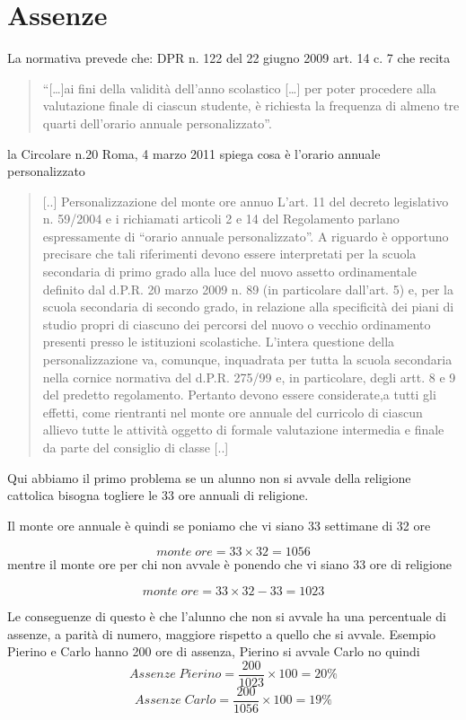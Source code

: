 \documentclass{article}
\begin{document}
\section*{Assenze}
La normativa prevede che: 	DPR n. 122 del 22 giugno 2009 art. 14 c. 7 che recita

\begin{quotation}

 “[…]ai fini della validità dell’anno scolastico
[…] per poter procedere alla valutazione finale di ciascun studente, 
è richiesta la frequenza di almeno tre
quarti dell’orario annuale personalizzato”.
\end{quotation}

la Circolare n.20 Roma, 4 marzo 2011 spiega cosa è l'orario annuale personalizzato

	\begin{quotation}
		[..]
	Personalizzazione del monte ore annuo
	L’art. 11 del decreto legislativo n. 59/2004 e i richiamati articoli 
	2 e 14 del Regolamento
	parlano espressamente di “orario annuale personalizzato”.
	A riguardo è opportuno precisare che tali riferimenti devono essere interpretati per la scuola secondaria di primo grado 
	alla luce del nuovo assetto ordinamentale 
	definito dal d.P.R. 20 marzo
	2009 n. 89 (in particolare dall'art. 5) e, per la scuola 
	secondaria 
	di secondo grado, in relazione alla
	specificità dei piani di studio propri di ciascuno dei percorsi 
	del nuovo o vecchio ordinamento
	presenti presso le istituzioni scolastiche.
	L’intera questione della personalizzazione va, comunque, inquadrata
	 per tutta la scuola secondaria nella cornice normativa del d.P.R. 275/99 e,
	 in particolare, degli artt. 8 e 9 del predetto regolamento.
	Pertanto devono essere considerate,a tutti gli effetti, 
	come rientranti nel monte ore annuale del curricolo di ciascun 
	allievo tutte le attività 
	oggetto di formale valutazione intermedia e finale da
	parte del consiglio di classe 
	[..]
	\end{quotation}
Qui abbiamo il primo problema se un alunno non si avvale della religione cattolica 
bisogna togliere le 33 ore annuali di religione.

Il monte ore annuale è quindi se poniamo che vi siano 33 settimane di 32 ore

\[monte\; ore=33\times 32=1056\]
mentre il monte ore per chi non avvale è ponendo che vi siano 33 ore di religione

\[monte\; ore=33\times 32-33=1023\]

Le conseguenze di questo è che l'alunno che non si avvale ha una percentuale di assenze, a parità di numero, maggiore rispetto a quello che si avvale. Esempio Pierino e Carlo hanno 200 ore di assenza, Pierino si avvale Carlo no quindi
\[Assenze\; Pierino=\dfrac{200}{1023}\times 100=20\%\]
\[Assenze\; Carlo=\dfrac{200}{1056}\times 100=19\%\]
\end{document}
